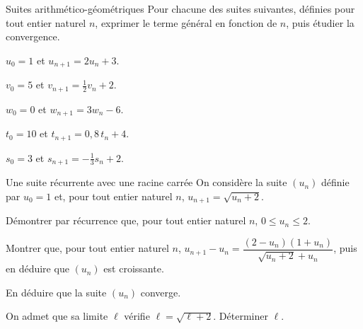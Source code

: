 \begin{exercice}[3]{Suites arithmético-géométriques}
Pour chacune des suites suivantes, définies pour tout entier naturel $n$, exprimer le terme général
en fonction de $n$, puis étudier la convergence.
\begin{questions}
  \item $u_0=1$ et $u_{n+1}=2u_n+3$.
  \item $v_0=5$ et $v_{n+1}=\frac{1}{2}v_n+2$.
  \item $w_0=0$ et $w_{n+1}=3w_n-6$.
  \item $t_0=10$ et $t_{n+1}=0{,}8\,t_n+4$.
  \item $s_0=3$ et $s_{n+1}=-\frac{1}{3}s_n+2$.
\end{questions}
\end{exercice}


\begin{exercice}[3]{Une suite récurrente avec une racine carrée}
On considère la suite $(u_n)$ définie par $u_0=1$ et, pour tout entier naturel $n$,
$u_{n+1}=\sqrt{u_n+2}$.
\begin{questions}
  \item Démontrer par récurrence que, pour tout entier naturel $n$, $0\leq u_n\leq2$.
  \item Montrer que, pour tout entier naturel $n$,
    $u_{n+1}-u_n=\dfrac{(2-u_n)(1+u_n)}{\sqrt{u_n+2}+u_n}$, puis en déduire que $(u_n)$ est croissante.
  \item En déduire que la suite $(u_n)$ converge.
  \item On admet que sa limite $\ell$ vérifie $\ell=\sqrt{\ell+2}$. Déterminer $\ell$.
\end{questions}
\end{exercice}

